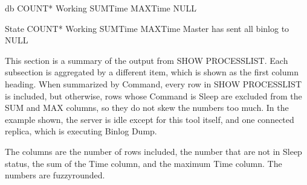 \documentclass[letterpaper,10pt,english]{sphinxmanual}
\begin{document}
\begin{sphinxVerbatim}[commandchars=\\\{\}]
  db                             COUNT* Working SUMTime MAXTime
  \PYGZhy{}\PYGZhy{}\PYGZhy{}\PYGZhy{}\PYGZhy{}\PYGZhy{}\PYGZhy{}\PYGZhy{}\PYGZhy{}\PYGZhy{}\PYGZhy{}\PYGZhy{}\PYGZhy{}\PYGZhy{}\PYGZhy{}\PYGZhy{}\PYGZhy{}\PYGZhy{}\PYGZhy{}\PYGZhy{}\PYGZhy{}\PYGZhy{}\PYGZhy{}\PYGZhy{}\PYGZhy{}\PYGZhy{}\PYGZhy{}\PYGZhy{}\PYGZhy{}\PYGZhy{} \PYGZhy{}\PYGZhy{}\PYGZhy{}\PYGZhy{}\PYGZhy{}\PYGZhy{}\PYGZhy{}\PYGZhy{} \PYGZhy{}\PYGZhy{}\PYGZhy{}\PYGZhy{}\PYGZhy{}\PYGZhy{}\PYGZhy{} \PYGZhy{}\PYGZhy{}\PYGZhy{}\PYGZhy{}\PYGZhy{}\PYGZhy{}\PYGZhy{}\PYGZhy{}\PYGZhy{} \PYGZhy{}\PYGZhy{}\PYGZhy{}\PYGZhy{}\PYGZhy{}\PYGZhy{}\PYGZhy{}\PYGZhy{}\PYGZhy{}
  NULL                                                 

  State                          COUNT* Working SUMTime MAXTime
  \PYGZhy{}\PYGZhy{}\PYGZhy{}\PYGZhy{}\PYGZhy{}\PYGZhy{}\PYGZhy{}\PYGZhy{}\PYGZhy{}\PYGZhy{}\PYGZhy{}\PYGZhy{}\PYGZhy{}\PYGZhy{}\PYGZhy{}\PYGZhy{}\PYGZhy{}\PYGZhy{}\PYGZhy{}\PYGZhy{}\PYGZhy{}\PYGZhy{}\PYGZhy{}\PYGZhy{}\PYGZhy{}\PYGZhy{}\PYGZhy{}\PYGZhy{}\PYGZhy{}\PYGZhy{} \PYGZhy{}\PYGZhy{}\PYGZhy{}\PYGZhy{}\PYGZhy{}\PYGZhy{}\PYGZhy{}\PYGZhy{} \PYGZhy{}\PYGZhy{}\PYGZhy{}\PYGZhy{}\PYGZhy{}\PYGZhy{}\PYGZhy{} \PYGZhy{}\PYGZhy{}\PYGZhy{}\PYGZhy{}\PYGZhy{}\PYGZhy{}\PYGZhy{}\PYGZhy{}\PYGZhy{} \PYGZhy{}\PYGZhy{}\PYGZhy{}\PYGZhy{}\PYGZhy{}\PYGZhy{}\PYGZhy{}\PYGZhy{}\PYGZhy{}
  Master has sent all binlog to                        
  NULL                                                           
\end{sphinxVerbatim}

\sphinxAtStartPar
This section is a summary of the output from SHOW PROCESSLIST. Each sub\sphinxhyphen{}section
is aggregated by a different item, which is shown as the first column heading.
When summarized by Command, every row in SHOW PROCESSLIST is included, but
otherwise, rows whose Command is Sleep are excluded from the SUM and MAX
columns, so they do not skew the numbers too much. In the example shown, the
server is idle except for this tool itself, and one connected replica, which
is executing Binlog Dump.

\sphinxAtStartPar
The columns are the number of rows included, the number that are not in Sleep
status, the sum of the Time column, and the maximum Time column. The numbers are
fuzzy\sphinxhyphen{}rounded.
\end{document}
